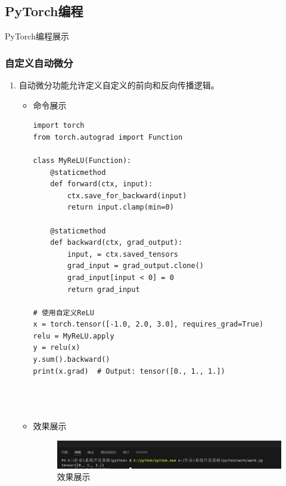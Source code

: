 \documentclass[UTF8]{ctexart}
\begin{document}
  \subsection{PyTorch编程}
  {\color{blue}PyTorch编程展示}






\subsubsection{自定义自动微分}

\begin{enumerate}
  \item 自动微分功能允许定义自定义的前向和反向传播逻辑。
  \begin{itemize}
  \item 命令展示
  \begin{verbatim}
import torch
from torch.autograd import Function

class MyReLU(Function):
    @staticmethod
    def forward(ctx, input):
        ctx.save_for_backward(input)
        return input.clamp(min=0)

    @staticmethod
    def backward(ctx, grad_output):
        input, = ctx.saved_tensors
        grad_input = grad_output.clone()
        grad_input[input < 0] = 0
        return grad_input

# 使用自定义ReLU
x = torch.tensor([-1.0, 2.0, 3.0], requires_grad=True)
relu = MyReLU.apply
y = relu(x)
y.sum().backward()
print(x.grad)  # Output: tensor([0., 1., 1.])


    
  \end{verbatim}

\item 效果展示
 \begin{figure}[H]
    \centering
    \includegraphics[width=\textwidth]{31} %
    \caption{效果展示}
  \end{figure}

  \end{itemize}
\end{enumerate}
\end{document}
